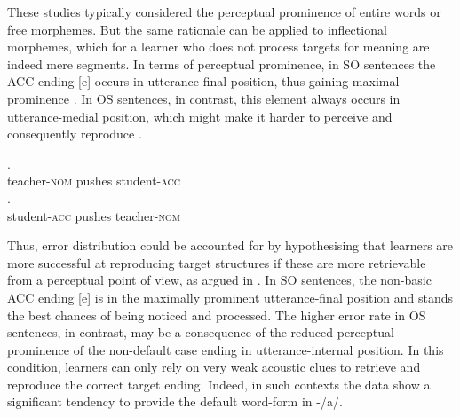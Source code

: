 These studies typically considered the perceptual prominence of entire words or free morphemes. But the same rationale can be applied to inflectional morphemes, which for a learner who does not process targets for meaning are indeed mere segments. In terms of perceptual prominence, in SO sentences the ACC ending [e] occurs in utterance-final position, thus gaining maximal prominence . In OS sentences, in contrast, this element always occurs in utterance-medial position, which might make it harder to perceive and consequently reproduce .

\ea%
    \label{ex:08:9}
    \ea\label{ex:08:9a}
    .\\
            teacher-\textsc{nom}  pushes  student-\textsc{acc}\\
    \ex\label{ex:08:9b}
    .\\
            student-\textsc{acc}  pushes  teacher-\textsc{nom}\\
    \z
\z

Thus, error distribution could be accounted for by hypothesising that learners are more successful at reproducing target structures if these are more retrievable from a perceptual point of view, as argued in \citet{Saturno2015a}. In SO sentences, the non-basic ACC ending [e] is in the maximally prominent utterance-final position and stands the best chances of being noticed and processed. The higher error rate in OS sentences, in contrast, may be a consequence of the reduced perceptual prominence of the non-default case ending in utterance-internal position. In this condition, learners can only rely on very weak acoustic clues to retrieve and reproduce the correct target ending. Indeed, in such contexts the data show a significant tendency to provide the default word-form in -/a/. 

